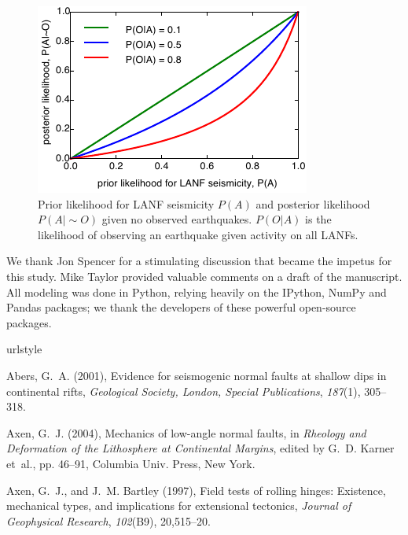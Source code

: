 \documentclass[twocolumn,grl]{AGUTeX}
\begin{document}
\begin{article}
\begin{figure}%
 \noindent\includegraphics{./figures/posteriors.pdf}
 \caption{Prior likelihood for LANF seismicity $P(A)$ and posterior
 likelihood $P(A|\sim O)$ given no observed earthquakes.  
 $P(O|A)$ is the likelihood of observing an earthquake given activity
 on all LANFs.}
 \label{fig:posteriors}
\end{figure}

\begin{acknowledgements}
  We thank Jon Spencer for a stimulating discussion that became the impetus for
  this study.  Mike Taylor provided valuable comments on a draft of the
  manuscript.  All modeling was done in Python, relying heavily on the IPython,
  NumPy and Pandas packages; we thank the developers of these powerful
  open-source packages. 
 
\end{acknowledgements}

\begin{thebibliography}{28}
\providecommand{\natexlab}[1]{#1}
\expandafter\ifx\csname urlstyle\endcsname\relax
  \providecommand{\doi}[1]{doi:\discretionary{}{}{}#1}\else
  \providecommand{\doi}{doi:\discretionary{}{}{}\begingroup
  \urlstyle{rm}\Url}\fi

Abers, G.~A. (2001), Evidence for seismogenic normal faults at shallow dips in
  continental rifts, \textit{Geological Society, London, Special Publications},
  \textit{187}(1), 305--318.

Axen, G.~J. (2004), Mechanics of low-angle normal faults, in \textit{Rheology
  and Deformation of the Lithosphere at Continental Margins}, edited by G.~D.
  Karner et~al., pp. 46--91, Columbia Univ. Press, New York.

Axen, G.~J., and J.~M. Bartley (1997), Field tests of rolling hinges:
  Existence, mechanical types, and implications for extensional tectonics,
  \textit{Journal of Geophysical Research}, \textit{102}(B9), 20,515--20.


\end{thebibliography}
\end{article}
\end{document}
